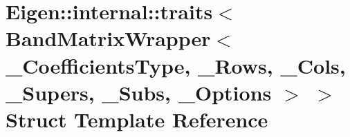 \hypertarget{struct_eigen_1_1internal_1_1traits_3_01_band_matrix_wrapper_3_01___coefficients_type_00_01___row768e2717402a9eceb38d536f65ceb4f1}{}\section{Eigen\+::internal\+::traits$<$ Band\+Matrix\+Wrapper$<$ \+\_\+\+Coefficients\+Type, \+\_\+\+Rows, \+\_\+\+Cols, \+\_\+\+Supers, \+\_\+\+Subs, \+\_\+\+Options $>$ $>$ Struct Template Reference}
\label{struct_eigen_1_1internal_1_1traits_3_01_band_matrix_wrapper_3_01___coefficients_type_00_01___row768e2717402a9eceb38d536f65ceb4f1}
